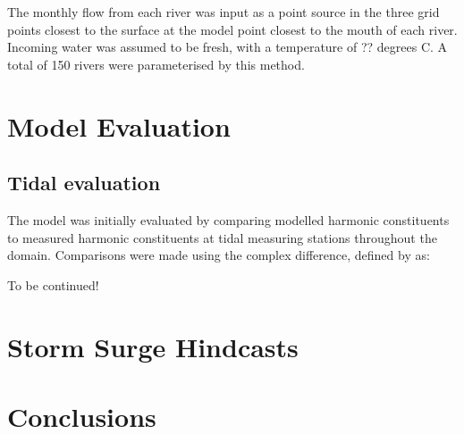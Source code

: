 \documentclass[pdftex,12pt]{article}
\begin{document}
The monthly flow from each river was input as a point source in the three grid points closest to the surface at the model point closest to the mouth of each river. Incoming water was assumed to be fresh, with a temperature of ?? degrees C. A total of 150 rivers were parameterised by this method. 

\section{Model Evaluation}\label{sec:model}
\subsection{Tidal evaluation}
The model was initially evaluated by comparing modelled harmonic constituents to measured harmonic constituents at tidal measuring stations throughout the domain. Comparisons were made using the complex difference, defined by \cite{foreman95tidal} as:

To be continued!

\section{Storm Surge Hindcasts}\label{sec:storm}

\section{Conclusions}\label{sec:conclusions}




\end{document}
